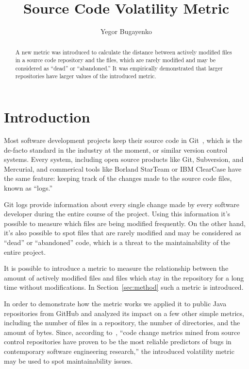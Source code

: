 \documentclass[12pt]{article}
\title{Source Code Volatility Metric}
\author{Yegor Bugayenko}{}{}
\begin{document}
\raggedbottom
\maketitle

\begin{abstract}
A new metric was introduced to calculate the distance
between actively modified files in a source code repository
and the files, which are rarely modified and may be considered
as ``dead'' or ``abandoned.'' It was empirically demonstrated that larger repositories
have larger values of the introduced metric.
\end{abstract}

\section{Introduction}

Most software development projects keep their source code in Git~\citet{loeliger2012},
which is the de-facto standard in the industry at the moment, or similar
version control systems. Every system, including open
source products like Git, Subversion, and Mercurial, and commerical tools
like Borland StarTeam\texttrademark{} or IBM ClearCase\texttrademark{}
have the same feature: keeping track of the changes
made to the source code files, known as ``logs.''

Git logs provide information about every single change made by every software
developer during the entire course of the project. Using this information
it's possible to measure which files are being modified frequently. On the
other hand, it's also possible to spot files that are rarely modified and may
be considered as ``dead'' or ``abandoned'' code, which is a threat
to the maintainability of the entire project.

It is possible to introduce a metric to measure the relationship
between the amount of actively modified files and files which stay
in the repository for a long time without modifications.
In Section~\ref{sec:method} such a metric is introduced.

In order to demonstrate how the metric works we applied it to
\thetotalrepos{} public Java repositories from GitHub and analyzed
its impact on a few other simple metrics, including the number
of files in a repository, the number of directories, and the amount
of bytes. Since, according to~\citet{muthukumaran2015},
``code change metrics mined from source control repositories have
proven to be the most reliable predictors of bugs in
contemporary software engineering research,'' the introduced volatility
metric may be used to spot maintainability issues.
\end{document}
